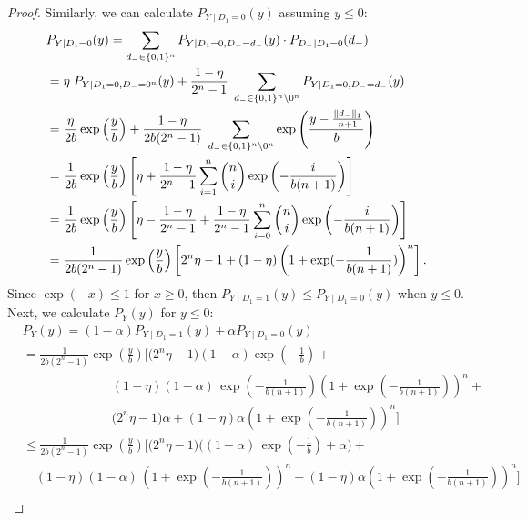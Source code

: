 \begin{proof}
Similarly, we can calculate $P_{Y \mid D_1=0}(y)$ assuming $y \leq 0$:  
\begin{align*}
    &P_{Y \mid D_1=0}(y) = \sum_{d_- \in \{0,1\}^{n}} P_{Y \mid D_1=0, D_-=d_-}(y) \cdot P_{D_- \mid D_1=0}(d_-) \\
    &= \eta \; P_{Y \mid D_1=0, D_-= 0^n}(y) + \frac{1-\eta}{2^{n} -1} \; \sum_{d_- \in \{0,1\}^{n} \setminus 0^{n}} P_{Y \mid D_1=0, D_-=d_-}(y)\\
    &= \frac{\eta}{2b} \exp \left(\frac{y}{b} \right) + \frac{1-\eta}{2b (2^{n} -1)} \; \sum_{d_- \in \{0,1\}^{n} \setminus 0^{n}} \exp \left(\frac{y - \frac{\lVert d_-\rVert_1}{n+1}}{b} \right)\\
    &= \frac{1}{2b} \exp \left(\frac{y}{b} \right) \left[\eta + \frac{1-\eta}{2^{n} -1}  \sum_{i=1}^{n} \binom{n}{i} \exp \left(- \frac{i}{b(n+1)} \right) \right] \\  
    &= \frac{1}{2b} \exp \left(\frac{y}{b} \right) \left[\eta - \frac{1-\eta}{2^{n} -1} + \frac{1-\eta}{2^{n} -1}  \sum_{i=0}^{n} \binom{n}{i} \exp \left(- \frac{i}{b(n+1)} \right) \right] \\  
    &= \frac{1}{2b (2^{n} -1)} \exp \left(\frac{y}{b} \right) \left[2^n  \eta - 1 + (1-\eta) \left(1 + \exp (- \frac{1}{b(n +1)}) \right)^n\right].  \\  
\end{align*}
Since $\exp(-x) \leq 1$ for $x \geq 0$, then $P_{Y \mid D_1=1}(y) \leq P_{Y \mid D_1=0}(y)$ when $y \leq 0$. Next, we calculate $P_Y(y)$ for $y \leq 0$: 
\begin{align*}
    &P_Y(y) = (1 - \alpha) P_{Y \mid D_1 = 1}(y) + \alpha P_{Y \mid D_1=0}(y) \\
    &= \frac{1}{2b (2^{n} -1)} \exp \left(\frac{y}{b} \right) \Bigg[\Big(2^n \eta - 1\Big) (1 - \alpha) \exp \left(-\frac{1}{b} \right) + \\
    &\hspace{7em} (1-\eta) (1 - \alpha)\, \exp \left(-\frac{1}{b(n+1)}\right) \left(1 + \exp (- \frac{1}{b(n+1)}) \right)^n + \\
    &\hspace{7em} \big(2^n \eta - 1\big) \alpha +  (1-\eta) \alpha \left(1 + \exp (- \frac{1}{b(n +1)}) \right)^n \Bigg]\\
    &\leq \frac{1}{2b (2^{n} -1)} \exp \left(\frac{y}{b} \right) \Bigg[\Big(2^n \eta - 1\Big) \Big( (1 - \alpha)\, \exp \left(-\frac{1}{b}\right) + \alpha \Big) + \\
    &\hspace{1em} (1-\eta) (1 - \alpha)\, \left(1 + \exp (- \frac{1}{b(n+1)}) \right)^n + (1-\eta) \alpha \left(1 + \exp (- \frac{1}{b(n +1)}) \right)^n \Bigg]\\

\end{align*}
\end{proof}
